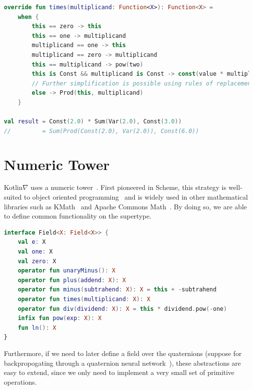 \documentclass[12pt,initial,twoside,maitrise]{dms}
\numberwithin{equation}{section}
\numberwithin{table}{chapter}
\numberwithin{figure}{chapter}
\begin{document}
\begin{lstlisting}[caption={Multiple dispatch allows us to put all related control flow on a single abstract class which is inherited by subclasses, simplifying readability, debugging and refactoring.}, language=Kotlin]
override fun times(multiplicand: Function<X>): Function<X> =
    when {
        this == zero -> this
        this == one -> multiplicand
        multiplicand == one -> this
        multiplicand == zero -> multiplicand
        this == multiplicand -> pow(two)
        this is Const && multiplicand is Const -> const(value * multiplicand.value)
        // Further simplification is possible using rules of replacement
        else -> Prod(this, multiplicand)
    }

val result = Const(2.0) * Sum(Var(2.0), Const(3.0))
//         = Sum(Prod(Const(2.0), Var(2.0)), Const(6.0))
\end{lstlisting}

\section{Numeric Tower}\label{sec:numeric-tower}

Kotlin$\nabla$ uses a numeric tower~\cite{st2012typing}. First pioneered in Scheme\cite{sperber2009revised}, this strategy is well-suited to object oriented programming~\cite{niculescu2003design, niculescu2011using} and is widely used in other mathematical libraries such as KMath~\cite{nozik2019acat} and Apache Commons Math~\cite{developers2012apache}. By doing so, we are able to define common functionality on the supertype.

\begin{lstlisting}[caption={Many common mathematical operations can be defined in simpler terms.}, language=Kotlin]
interface Field<X: Field<X>> {
    val e: X
    val one: X
    val zero: X
    operator fun unaryMinus(): X
    operator fun plus(addend: X): X
    operator fun minus(subtrahend: X): X = this + -subtrahend
    operator fun times(multiplicand: X): X
    operator fun div(dividend: X): X = this * dividend.pow(-one)
    infix fun pow(exp: X): X
    fun ln(): X
}
\end{lstlisting}

Furthermore, if we need to later define a field over the quaternions (suppose for backpropogating through a quaternion neural network~\cite{isokawa2003quaternion}), these abstractions are easy to extend, since we only need to implement a very small set of primitive operations.
\end{document}

